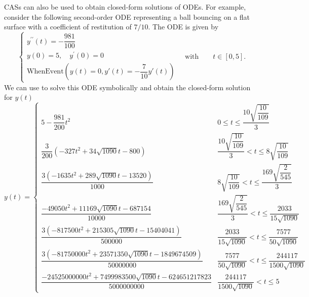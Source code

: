 \acp{CAS} can also be used to obtain closed-form solutions of \acp{ODE}. For example, consider the following second-order \ac{ODE} representing a ball bouncing on a flat surface with a coefficient of restitution of $7/10$. The \ac{ODE} is given by
%
\begin{equation*}
  \begin{cases}
    y^{\prime\prime}(t) = -\dfrac{981}{100} \\[0.1em]
    y(0) = 5, \quad y^{\prime}(0) = 0 \\[0.1em]
    \mathrm{WhenEvent}(y(t) = 0, y'(t) = -\dfrac{7}{10}y'(t))
  \end{cases}
  \quad \text{with} \qquad t \in [0, 5].
\end{equation*}
%
We can use \Mathematica{} to solve this \ac{ODE} symbolically and obtain the closed-form solution for $y(t)$
%
\begin{equation}
  y(t) = \begin{cases}
    5-\dfrac{981}{200}t^2 &
      0\leq t\leq \dfrac{10 \sqrt{\dfrac{10}{109}}}{3} \\[0.1em]
    \dfrac{3}{200} \left(-327 t^2+34 \sqrt{1090} t-800\right) &
      \dfrac{10\sqrt{\dfrac{10}{109}}}{3}<t\leq 8 \sqrt{\dfrac{10}{109}} \\[0.1em]
    \dfrac{3 \left(-1635 t^2+289 \sqrt{1090} t-13520\right)}{1000} &
      8\sqrt{\dfrac{10}{109}}<t\leq \dfrac{169 \sqrt{\dfrac{2}{545}}}{3} \\[0.1em]
    \dfrac{-49050 t^2+11169 \sqrt{1090} t-687154}{10000} &
      \dfrac{169\sqrt{\dfrac{2}{545}}}{3}<t\leq \dfrac{2033}{15 \sqrt{1090}} \\[0.1em]
    \dfrac{3 \left(-817500 t^2+215305 \sqrt{1090} t-15404041\right)}{500000} &
      \dfrac{2033}{15\sqrt{1090}}<t\leq \dfrac{7577}{50 \sqrt{1090}} \\[0.1em]
    \dfrac{3 \left(-81750000 t^2+23571350 \sqrt{1090} t-1849674509\right)}{50000000} &
      \dfrac{7577}{50 \sqrt{1090}}<t\leq \dfrac{244117}{1500 \sqrt{1090}} \\[0.1em]
    \dfrac{-24525000000 t^2+7499983500 \sqrt{1090} t-624651217823}{5000000000} &
      \dfrac{244117}{1500 \sqrt{1090}}<t\leq 5
    \end{cases}
\end{equation}


